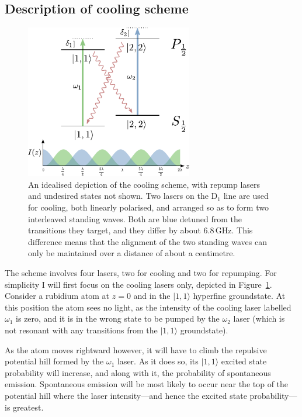 \subsection{Description of cooling scheme}

\begin{figure}
\begin{center}
\includegraphics[width=0.65\textwidth]{figures/unsorted/cooling_simplified.pdf}
\caption{\label{fig:cooling_simplified}An idealised depiction of the cooling scheme, with repump lasers and undesired states not shown. Two lasers on the D$_1$ line are used for cooling, both linearly polarised, and arranged so as to form two interleaved standing waves. Both are blue detuned from the transitions they target, and they differ by about $6.8\,$GHz. This difference means that the alignment of the two standing waves can only be maintained over a distance of about a centimetre.}
\end{center}
\end{figure}

The scheme involves four lasers, two for cooling and two for repumping. For simplicity I will first focus on the cooling lasers only, depicted in Figure~\ref{fig:cooling_simplified}. Consider a rubidium atom at $z=0$ and in the $|1,1\rangle$ hyperfine groundstate. At this position the atom sees no light, as the intensity of the cooling laser labelled $\omega_1$ is zero, and it is in the wrong state to be pumped by the $\omega_2$ laser (which is not resonant with any transitions from the $|1,1\rangle$ groundstate).

As the atom moves rightward however, it will have to climb the repulsive potential hill formed by the $\omega_1$ laser. As it does so, its $|1,1\rangle$ excited state probability will increase, and along with it, the probability of spontaneous emission. Spontaneous emission will be most likely to occur near the top of the potential hill where the laser intensity---and hence the excited state probability---is greatest.

